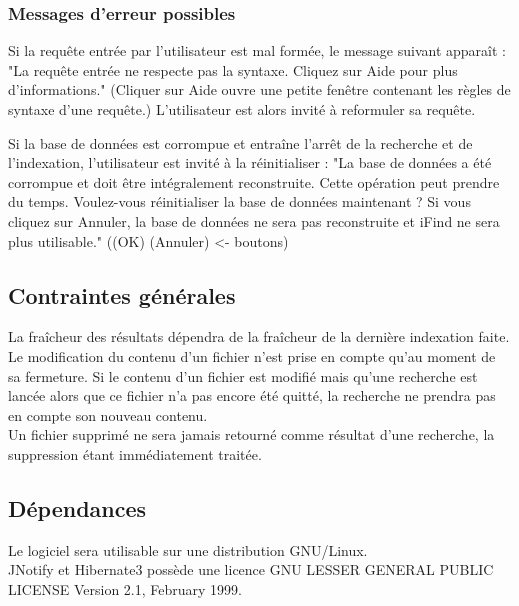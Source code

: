 

\subsubsection{Messages d'erreur possibles}
Si la requête entrée par l'utilisateur est mal formée, le message suivant apparaît :
"La requête entrée ne respecte pas la syntaxe. Cliquez sur Aide pour plus d'informations."
(Cliquer sur Aide ouvre une petite fenêtre contenant les règles de syntaxe d'une requête.)
L'utilisateur est alors invité à reformuler sa requête.

Si la base de données est corrompue et entraîne l'arrêt de la recherche et de l'indexation, l'utilisateur est invité à la réinitialiser :
"La base de données a été corrompue et doit être intégralement reconstruite. 
Cette opération peut prendre du temps. Voulez-vous réinitialiser la base de données maintenant ?
Si vous cliquez sur Annuler, la base de données ne sera pas reconstruite et iFind ne sera plus utilisable."
((OK) (Annuler) <- boutons)

\subsection{Contraintes générales}
La fraîcheur des résultats dépendra de la fraîcheur de la dernière indexation faite.\\
Le modification du contenu d'un fichier n'est prise en compte qu'au moment de sa
fermeture. Si le contenu d'un fichier est modifié mais qu'une recherche est
lancée alors que ce fichier n'a pas encore été quitté, la recherche ne prendra
pas en compte son nouveau contenu.\\
Un fichier supprimé ne sera jamais retourné comme résultat d'une recherche, la
suppression étant immédiatement traitée.


\subsection{Dépendances}
Le logiciel sera utilisable sur une distribution GNU/Linux.\\
JNotify et Hibernate3 possède une licence GNU LESSER GENERAL PUBLIC LICENSE Version 2.1, February 1999.
\newpage


